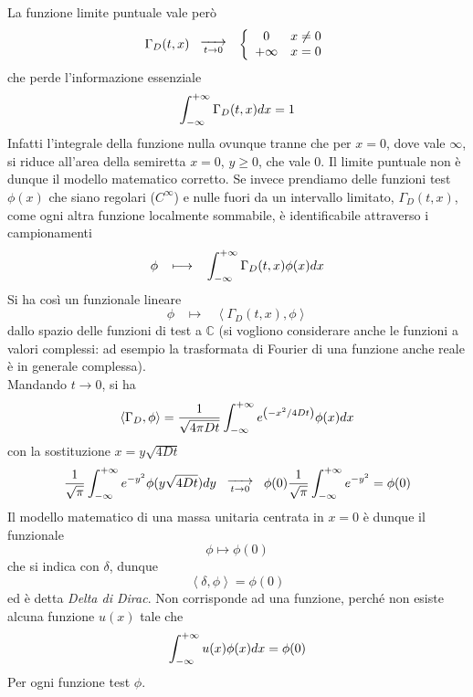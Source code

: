 \noindent
La funzione limite puntuale vale per\`o
\[
	\Gamma_D(t,x)
	\;\;\;
	\substack{\xrightarrow{\hspace*{5mm}} \\ t\rightarrow 0}
	\;\;\;
	\left\{
		\begin{array}{cl}
			0 		& x \neq 0 \\
			+ \infty	& x= 0 \\
		\end{array}
	\right.
\]
che perde l'informazione essenziale
\[
	\int_{- \infty}^{+ \infty} \Gamma_D(t,x) dx= 1
\]
Infatti l'integrale della funzione nulla ovunque tranne che per $x=0$, dove vale $\infty$, si riduce all'area della semiretta $x=0$, $y\geq 0$, che vale
0. Il limite puntuale non \`e dunque il modello matematico corretto.
Se invece prendiamo delle funzioni test $\phi (x)$ che siano regolari
($C^\infty$) e nulle fuori da un intervallo limitato, $\Gamma_D(t,x)$, 
come ogni altra funzione localmente sommabile, \`e identificabile attraverso
i campionamenti
\[
	\phi \;\;\; \longmapsto \;\;\;
	\int_{- \infty}^{+ \infty} \Gamma_D(t,x) \phi(x) dx
\]
Si ha cos\`i un funzionale lineare
\[
	\phi \;\;\; \longmapsto \;\;\;
	\left< \Gamma_D(t,x), \phi \right>
\]
dallo spazio delle funzioni di test a $\mathbb{C}$ (si vogliono considerare
anche le funzioni a valori complessi: ad esempio la trasformata di Fourier di
una funzione anche reale \`e in generale complessa).\\
Mandando $t \to 0$, si ha
\[
	\left< \Gamma_D, \phi \right>=
	\frac{1}{\sqrt{4 \pi D t}} \int_{- \infty}^{+ \infty}
	e^{\left( -x^2/4Dt \right)}
	\phi (x) dx
\]
con la sostituzione $x= y \sqrt{4Dt}$
\[
	\frac{1}{\sqrt{\pi}} \int_{- \infty}^{+ \infty}
	e^{-y^2}\phi (y\sqrt{4Dt}) dy
	\;\;\;
	\substack{\xrightarrow{\hspace*{5mm}} \\ t\rightarrow 0}
	\;\;\;
	\phi(0)\frac{1}{\sqrt{\pi}}
	\int_{- \infty}^{+ \infty} e^{-y^2}= \phi(0)
\]
Il modello matematico di una massa unitaria centrata in $x=0$ \`e dunque 
il funzionale
\[
	\phi \longmapsto \phi(0)
\]
che si indica con $\delta$, dunque
\[
	\left< \delta, \phi \right> = \phi(0)
\]
ed \`e detta \textit{Delta di Dirac}.
Non corrisponde ad una funzione, perch\'e non esiste alcuna funzione $u(x)$
tale che
\[
	\int_{- \infty}^{+ \infty} u(x)\phi(x)dx= \phi (0)
\]
Per ogni funzione test $\phi$.

